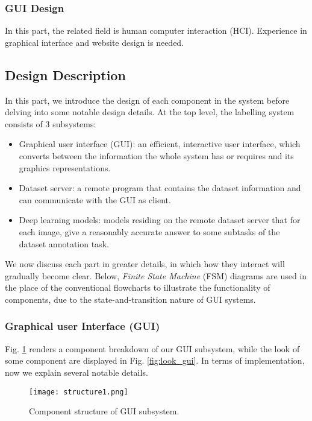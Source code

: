 \subsubsection{GUI Design}
In this part, the related field is human computer interaction (HCI). Experience in graphical interface and website design is needed. 

\subsection{Design Description}

In this part, we introduce the design of each component in the system before delving into some notable design details. At the top level, the labelling system consists of 3 subsystems:
\begin{itemize}
    \item Graphical user interface (GUI): an efficient, interactive user interface, which converts between the information the whole system has or requires and its graphics representations.
    \item Dataset server: a remote program that contains the dataset information and can communicate with the GUI as client.
    \item Deep learning models: models residing on the remote dataset server that for each image, give a reasonably accurate answer to some subtasks of the dataset annotation task.
\end{itemize}

We now discuss each part in greater details, in which how they interact will gradually become clear. Below, \textit{Finite State Machine} (FSM) diagrams are used in the place of the conventional flowcharts to illustrate the functionality of components, due to the state-and-transition nature of GUI systems.

\subsubsection{Graphical user Interface (GUI)}
\label{sec:gui}

Fig. \ref{fig:structure_gui} renders a component breakdown of our GUI subsystem, while the look of some component are displayed in Fig. \ref{fig:look_gui}. In terms of implementation, now we explain several notable details.

\begin{figure}[htbp!]
    \centering
    \texttt{[image: structure1.png]}
    \caption{Component structure of GUI subsystem.}
    \label{fig:structure_gui}
\end{figure}


